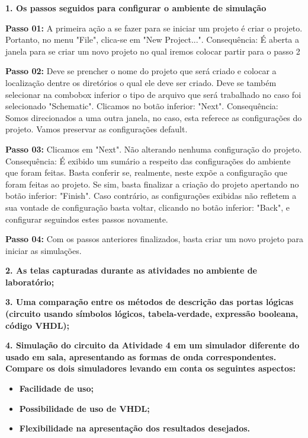\documentclass[12pts]{article}
\begin{document}
\textbf{1. Os passos seguidos para configurar o ambiente de simulação}

\singlespacing

\textbf{Passo 01:} A primeira ação a se fazer para se iniciar um projeto é criar o projeto. Portanto, no menu "File", clica-se em "New Project...". 
Consequência: É aberta a janela para se criar um novo projeto no qual iremos colocar partir para o passo 2
\singlespacing

\textbf{Passo 02:} Deve se prencher o nome do projeto que será criado e colocar a localização dentre os diretórios o qual ele deve ser criado. Deve se também selecionar na combobox inferior o tipo de arquivo que será trabalhado no caso foi selecionado "Schematic". Clicamos no botão inferior: "Next".
Consequência: Somos direcionados a uma outra janela, no caso, esta referece as configurações do projeto. Vamos preservar as configurações default.
\singlespacing

\textbf{Passo 03:} Clicamos em "Next". Não alterando nenhuma configuração do projeto. 
Consequência: É exibido um sumário a respeito das configurações do ambiente que foram feitas. Basta conferir se, realmente, neste expõe a configuração que foram feitas ao projeto. Se sim, basta finalizar a criação do projeto apertando no botão inferior: "Finish". Caso contrário, as configurações exibidas não refletem a sua vontade de configuração basta voltar, clicando no botão inferior: "Back", e configurar seguindos estes passos novamente. 
\singlespacing

\textbf{Passo 04:} Com os passos anteriores finalizados, basta criar um novo projeto para iniciar as simulações.
\singlespacing


\textbf{2. As telas capturadas durante as atividades no ambiente de laboratório;}
\singlespacing



\textbf{3. Uma comparação entre os métodos de descrição das portas lógicas (circuito usando símbolos lógicos, tabela-verdade, expressão booleana, código VHDL);}
\singlespacing



\textbf{4. Simulação do circuito da Atividade 4 em um simulador diferente do usado em sala, apresentando as formas de onda correspondentes. Compare os dois simuladores levando em conta os seguintes aspectos:}
\singlespacing
\begin{itemize}
	\item \textbf{Facilidade de uso;}
	\item \textbf{Possibilidade de uso de VHDL;}
	\item \textbf{Flexibilidade na apresentação dos resultados desejados.}
\end{itemize}
\end{document}
